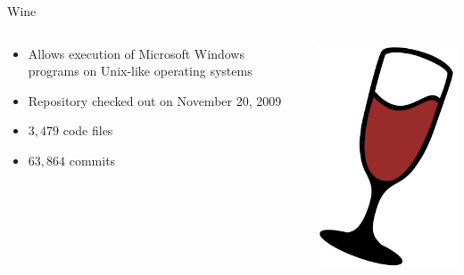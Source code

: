 \begin{frame}{Wine}
  \begin{columns}[c]
    \begin{column}{0.70\textwidth}
      \begin{itemize}
      \item Allows execution of Microsoft Windows programs on
        Unix-like operating systems
      \item Repository checked out on November 20, 2009
      \item $3,479$ code files
      \item $63,864$ commits
      \end{itemize}
    \end{column}
    \begin{column}{0.30\textwidth}
      \includegraphics[width=\textwidth]{figures/wine-logo}
    \end{column}
  \end{columns}
\end{frame}

